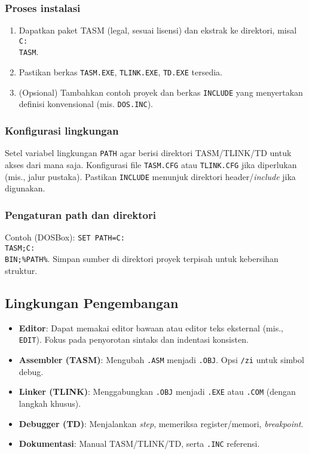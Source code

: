 \subsubsection{Proses instalasi}
\begin{enumerate}
  \item Dapatkan paket TASM (legal, sesuai lisensi) dan ekstrak ke direktori, misal \texttt{C:\\TASM}.
  \item Pastikan berkas \texttt{TASM.EXE}, \texttt{TLINK.EXE}, \texttt{TD.EXE} tersedia.
  \item (Opsional) Tambahkan contoh proyek dan berkas \texttt{INCLUDE} yang menyertakan definisi konvensional (mis. \texttt{DOS.INC}).
\end{enumerate}

\subsubsection{Konfigurasi lingkungan}
Setel variabel lingkungan \texttt{PATH} agar berisi direktori TASM/TLINK/TD untuk akses dari mana saja. Konfigurasi file \texttt{TASM.CFG} atau \texttt{TLINK.CFG} jika diperlukan (mis., jalur pustaka). Pastikan \texttt{INCLUDE} menunjuk direktori header/\textit{include} jika digunakan.

\subsubsection{Pengaturan path dan direktori}
Contoh (DOSBox): \texttt{SET PATH=C:\\TASM;C:\\BIN;\%PATH\%}. Simpan sumber di direktori proyek terpisah untuk kebersihan struktur.

\subsection{Lingkungan Pengembangan}
\begin{itemize}
  \item \textbf{Editor}: Dapat memakai editor bawaan atau editor teks eksternal (mis., \texttt{EDIT}). Fokus pada penyorotan sintaks dan indentasi konsisten.
  \item \textbf{Assembler (TASM)}: Mengubah \texttt{.ASM} menjadi \texttt{.OBJ}. Opsi \texttt{/zi} untuk simbol debug.
  \item \textbf{Linker (TLINK)}: Menggabungkan \texttt{.OBJ} menjadi \texttt{.EXE} atau \texttt{.COM} (dengan langkah khusus).
  \item \textbf{Debugger (TD)}: Menjalankan \textit{step}, memeriksa register/memori, \textit{breakpoint}.
  \item \textbf{Dokumentasi}: Manual TASM/TLINK/TD, serta \texttt{.INC} referensi.
\end{itemize}

